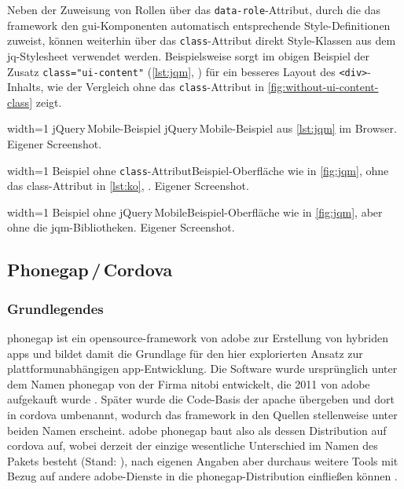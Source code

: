 Neben der Zuweisung von Rollen über das \lstinline|data-role|-Attribut, durch die das \gls{framework} den \gls{gui}-Komponenten automatisch entsprechende Style-Definitionen zuweist, können weiterhin über das \lstinline|class|-Attribut direkt Style-Klassen aus dem \gls{jq}-Stylesheet verwendet werden.
Beispielsweise sorgt im obigen Beispiel der Zusatz \lstinline|class="ui-content"| (\autoref{lst:jqm}, ) für ein besseres Layout des \lstinline|<div>|-Inhalts, wie der Vergleich ohne das \lstinline|class|-Attribut in \autoref{fig:without-ui-content-class} zeigt.


	{width=1\textwidth}
	{jQuery\,\-Mobile-Beispiel}
	{jQuery\,\-Mobile-Beispiel aus \autoref{lst:jqm} im Browser.}
	{Eigener Screenshot.}

	{width=1\textwidth}
	{Beispiel ohne \lstinline|class|-Attribut}{Beispiel-Oberfläche wie in \autoref{fig:jqm}, ohne das class-Attribut in \autoref{lst:ko}, .}
	{Eigener Screenshot.}

	{width=1\textwidth}
	{Beispiel ohne jQuery\,\-Mobile}{Beispiel-Oberfläche wie in \autoref{fig:jqm}, aber ohne die \gls{jqm}-Bibliotheken.}
	{Eigener Screenshot.}

\subsection{Phonegap\,/\,Cordova} \label{sec:cordova}


\subsubsection{Grundlegendes} \label{sec:cordova-grundlegendes}

\gls{phonegap} ist ein \gls{opensource}-\gls{framework} von \gls{adobe} zur Erstellung von hybriden \glspl{app} und bildet damit die Grundlage für den hier explorierten Ansatz zur plattformunabhängigen \gls{app}-Entwicklung.
Die Software wurde ursprünglich unter dem Namen \gls{phonegap} von der Firma \gls{nitobi} entwickelt, die 2011 von \gls{adobe} aufgekauft wurde \cite{Adobe_Announces_Agreement_to_Acquire_Nitobi_Creator_of_PhoneGap}. 
Später wurde die Code-Basis der \gls{apache} übergeben und dort in \gls{cordova} umbenannt, wodurch das \gls{framework} in den Quellen stellenweise unter beiden Namen erscheint.
\Gls{adobe} \gls{phonegap} baut also als dessen Distribution auf \gls{cordova} auf, wobei derzeit der einzige wesentliche Unterschied im Namen des Pakets besteht (Stand: ), nach eigenen Angaben aber durchaus weitere Tools mit Bezug auf andere \gls{adobe}-Dienste in die \gls{phonegap}-Distribution einfließen können \cite{PhoneGap_Cordova_and_whats_in_a_name}.

